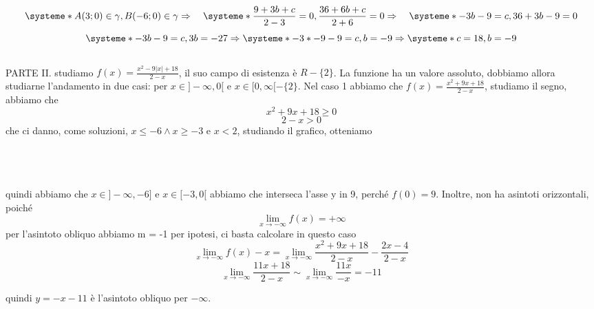 \documentclass{article}
\begin{document}
\[
\systeme*{A(3;0) \in \gamma, B(-6;0)\in \gamma}  \Rightarrow \quad
\systeme*{\frac{9+3b+c}{2-3} = 0, \frac{36+6b+c}{2+6} = 0} \Rightarrow \quad
\systeme*{-3b -9 = c, 36 + 3b -9  = 0} 
\] 
\[
\systeme*{-3b -9 = c, 3b = -27} \Rightarrow 
\systeme*{-3*-9 -9 = c, b = -9} \Rightarrow 
\systeme*{c = 18, b = -9} 
\]
\\
PARTE II.
studiamo
$f(x) = \frac{x^2 - 9|x| + 18}{2-x}$, il suo campo di esistenza è $R-\{2\}$. La funzione ha un valore assoluto, dobbiamo allora studiarne l'andamento in due casi: per $x \in ]-\infty, 0[$ e $x \in [0, \infty[ - \{2\}$.
Nel caso 1 abbiamo che $f(x) = \frac{x^2 + 9x + 18}{2-x}$, studiamo il segno, abbiamo che
\[
x^2 + 9x + 18 \geq 0
\]
\[
2-x > 0
\]
che ci danno, come soluzioni, $x \leq -6 \land x \geq -3$ e $x < 2$, studiando il grafico, otteniamo
\\\\
\\\\
quindi abbiamo che $x \in ]-\infty, -6]$ e $x \in [-3, 0[$
abbiamo che interseca l'asse y in 9, perché $f(0) = 9$.
Inoltre, non ha asintoti orizzontali, poiché
\[
\lim_{x \to -\infty} f(x) = +\infty
\]
per l'asintoto obliquo abbiamo m = -1 per ipotesi, ci basta calcolare in questo caso 
\[
\lim_{x\to-\infty} f(x)-x = \lim_{x\to-\infty}\frac{x^2 + 9x + 18}{2-x} - \frac{2x-4}{2-x}
\]
\[
\lim_{x\to-\infty}\frac{11x+18}{2-x} \sim \lim_{x\to-\infty}\frac{11x}{-x} = -11
\]

quindi $y = -x - 11$ è l'asintoto obliquo per $-\infty$.
\end{document}
